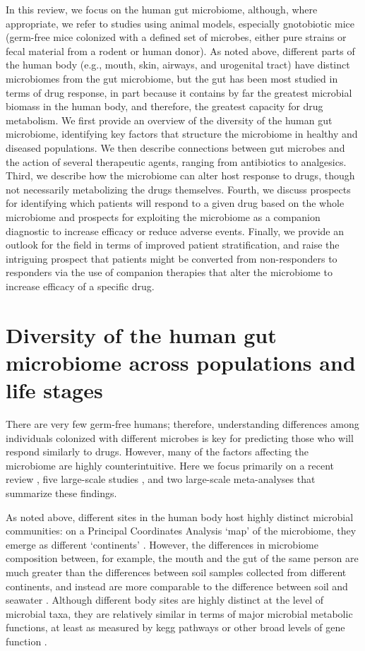 In this review, we focus on the human gut microbiome, although, where appropriate, we refer to studies using animal models, especially gnotobiotic mice (germ-free mice colonized with a defined set of microbes, either pure strains or fecal material from a rodent or human donor). As noted above, different parts of the human body (e.g., mouth, skin, airways, and urogenital tract) have distinct microbiomes from the gut microbiome, but the gut has been most studied in terms of drug response, in part because it contains by far the greatest microbial biomass in the human body, and therefore, the greatest capacity for drug metabolism. We first provide an overview of the diversity of the human gut microbiome, identifying key factors that structure the microbiome in healthy and diseased populations. We then describe connections between gut microbes and the action of several therapeutic agents, ranging from antibiotics to analgesics. Third, we describe how the microbiome can alter host response to drugs, though not necessarily metabolizing the drugs themselves. Fourth, we discuss prospects for identifying which patients will respond to a given drug based on the whole microbiome and prospects for exploiting the microbiome as a companion diagnostic to increase efficacy or reduce adverse events. Finally, we provide an outlook for the field in terms of improved patient stratification, and raise the intriguing prospect that patients might be converted from non-responders to responders via the use of companion therapies that alter the microbiome to increase efficacy of a specific drug.


\section{Diversity of the human gut microbiome across populations and life stages}

There are very few germ-free humans; therefore, understanding differences among individuals colonized with different microbes is key for predicting those who will respond similarly to drugs. However, many of the factors affecting the microbiome are highly counterintuitive. Here we focus primarily on a recent review \cite{RN4057}, five large-scale studies \cite{RN4108, RN4104, RN4107, RN4061, RN4059}, and two large-scale meta-analyses \cite{RN4062, RN4063} that summarize these findings.

As noted above, different sites in the human body host highly distinct microbial communities: on a Principal Coordinates Analysis `map' of the microbiome, they emerge as different `continents' \cite{RN4066, RN4107}. However, the differences in microbiome composition between, for example, the mouth and the gut of the same person are much greater than the differences between soil samples collected from different continents, and instead are more comparable to the difference between soil and seawater \cite{RN4087}. Although different body sites are highly distinct at the level of microbial taxa, they are relatively similar in terms of major microbial metabolic functions, at least as measured by \gls{kegg} pathways or other broad levels of gene function \cite{RN4107, RN4044}.

